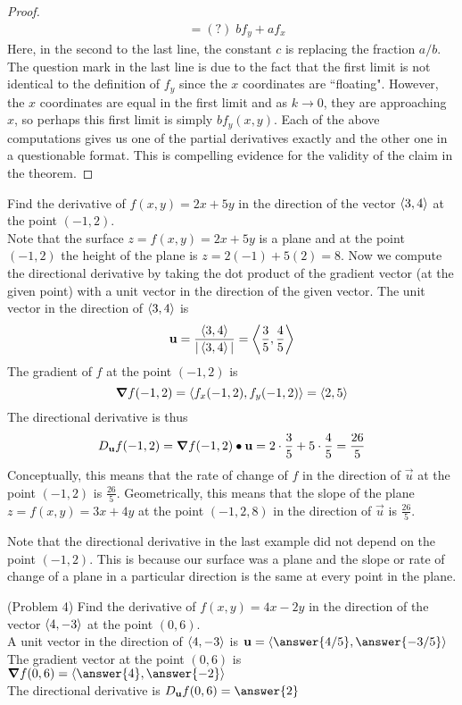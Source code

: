 \documentclass[handout]{ximera}
\begin{document}
\begin{proof}
\begin{align*}
                  &= (?)\;  b f_y + af_x
\end{align*}
Here, in the second to the last line, the constant $c$ is replacing the fraction $a/b$.  
The question mark in the last line is due to the fact that the first limit is not
identical to the definition of $f_y$ since the $x$ coordinates are ``floating".  
However, the $x$ coordinates are equal in the first limit and as $k \to 0$, they are approaching $x$, 
so perhaps this first limit is simply $bf_y(x,y)$.
Each of the above computations gives us one of the partial derivatives exactly and the other one in a questionable format. 
This is compelling evidence for the validity of the claim in the theorem.
\end{proof}


\begin{example}[Example 4]
Find the derivative of $f(x,y) = 2x + 5y$ in the direction of the vector $\left\langle 3,4\right\rangle$ at the point $(-1, 2)$.\\
Note that the surface $z = f(x,y) = 2x + 5y$ is a plane and at the point $(-1, 2)$ the height of the plane is $z = 2(-1) + 5(2) = 8$.
Now we compute the directional derivative by taking the dot product of the gradient vector (at the given point) with a unit 
vector in the direction of the given vector.
The unit vector in the direction of $\left\langle 3,4\right\rangle$ is
\[
\mathbf u = \frac{\left\langle 3,4\right\rangle}{|\left\langle 3,4\right\rangle|} = \left\langle \frac35, \frac45\right\rangle
\]
The gradient of $f$ at the point $(-1, 2)$ is
\[
\boldsymbol\nabla f(-1, 2) = \left\langle f_x(-1,2), f_y(-1,2)\right\rangle = \left\langle 2,5\right\rangle
\]
The directional derivative is thus
\[
D_{\mathbf u} f (-1, 2) = \boldsymbol\nabla f(-1, 2) \bullet \mathbf u = 2 \cdot \frac35 + 5 \cdot \frac45 = \frac{26}{5}
\]
Conceptually, this means that the rate of change of $f$ in the direction of $\vec u$ at the point $(-1, 2)$ is $\frac{26}{5}$.
Geometrically, this means that the slope of the plane $z = f(x,y) = 3x + 4y$ at the 
point $(-1, 2, 8)$ in the direction of $\vec u$ is $\frac{26}{5}$.
\end{example}

\begin{remark}
Note that the directional derivative in the last example did not depend on the point $(-1, 2)$.  
This is because our surface was a plane and the slope or rate of change of a plane in a particular 
direction is the same at every point in the plane.
\end{remark}

\begin{problem}(Problem 4)
Find the derivative of $f(x,y) = 4x - 2y$ in the direction of the vector $\left\langle 4, -3\right\rangle$ at the point $(0, 6)$.\\
A unit vector in the direction of $\left\langle 4, -3\right\rangle$ is $\vec u = \vector{\answer{4/5}, \answer{-3/5}}$\\
The gradient vector at the point $(0,6)$ is $\grad f(0,6) = \vector{\answer{4}, \answer{-2}}$\\
The directional derivative is $D_{\vec u} f(0,6) = \answer{2}$
\end{problem}
\end{document}
